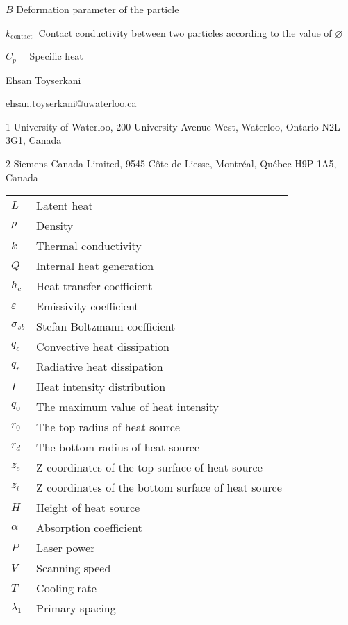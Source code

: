 \documentclass[10pt]{article}
\begin{document}
$B$ Deformation parameter of the particle

$k_{\text {contact }}$ Contact conductivity between two particles according to the value of $\varnothing$

$C_{p} \quad$ Specific heat

Ehsan Toyserkani

\href{mailto:ehsan.toyserkani@uwaterloo.ca}{ehsan.toyserkani@uwaterloo.ca}

1 University of Waterloo, 200 University Avenue West, Waterloo, Ontario N2L 3G1, Canada

2 Siemens Canada Limited, 9545 Côte-de-Liesse, Montréal, Québec H9P 1A5, Canada

\begin{center}
\begin{tabular}{ll}
$L$ & Latent heat \\
$\rho$ & Density \\
$k$ & Thermal conductivity \\
$Q$ & Internal heat generation \\
$h_{c}$ & Heat transfer coefficient \\
$\varepsilon$ & Emissivity coefficient \\
$\sigma_{s b}$ & Stefan-Boltzmann coefficient \\
$q_{c}$ & Convective heat dissipation \\
$q_{r}$ & Radiative heat dissipation \\
$I$ & Heat intensity distribution \\
$q_{0}$ & The maximum value of heat intensity \\
$r_{0}$ & The top radius of heat source \\
$r_{d}$ & The bottom radius of heat source \\
$z_{e}$ & Z coordinates of the top surface of heat source \\
$z_{i}$ & Z coordinates of the bottom surface of heat source \\
$H$ & Height of heat source \\
$\alpha$ & Absorption coefficient \\
$P$ & Laser power \\
$V$ & Scanning speed \\
$T$ & Cooling rate \\
$\lambda_{1}$ & Primary spacing \\
\end{tabular}
\end{center}
\end{document}
